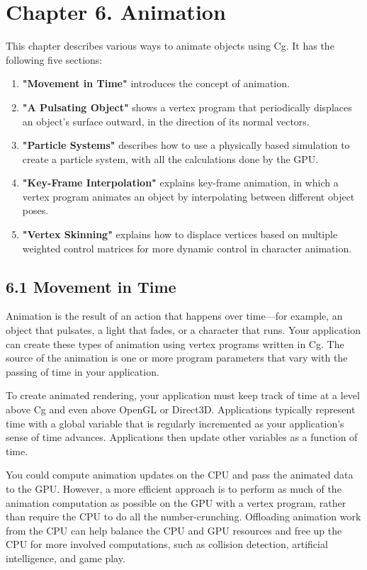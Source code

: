 \documentclass[../main.tex]{subfiles}
\begin{document}
\chapter{Chapter 6. Animation}

This chapter describes various ways to animate objects using Cg. It has the following five sections:

\begin{enumerate}
\item \textbf{"Movement in Time"} introduces the concept of animation.
\item \textbf{"A Pulsating Object"} shows a vertex program that periodically displaces an object's surface outward, in the direction of its normal vectors.
\item \textbf{"Particle Systems"} describes how to use a physically based simulation to create a particle system, with all the calculations done by the GPU.
\item \textbf{"Key-Frame Interpolation"} explains key-frame animation, in which a vertex program animates an object by interpolating between different object poses.
\item \textbf{"Vertex Skinning"} explains how to displace vertices based on multiple weighted control matrices for more dynamic control in character animation.
\end{enumerate}

\section{6.1 Movement in Time}

Animation is the result of an action that happens over time—for example, an object that pulsates, a light that fades, or a character that runs. Your application can create these types of animation using vertex programs written in Cg. The source of the animation is one or more program parameters that vary with the passing of time in your application.

To create animated rendering, your application must keep track of time at a level above Cg and even above OpenGL or Direct3D. Applications typically represent time with a global variable that is regularly incremented as your application's sense of time advances. Applications then update other variables as a function of time.

You could compute animation updates on the CPU and pass the animated data to the GPU. However, a more efficient approach is to perform as much of the animation computation as possible on the GPU with a vertex program, rather than require the CPU to do all the number-crunching. Offloading animation work from the CPU can help balance the CPU and GPU resources and free up the CPU for more involved computations, such as collision detection, artificial intelligence, and game play.
\end{document}

